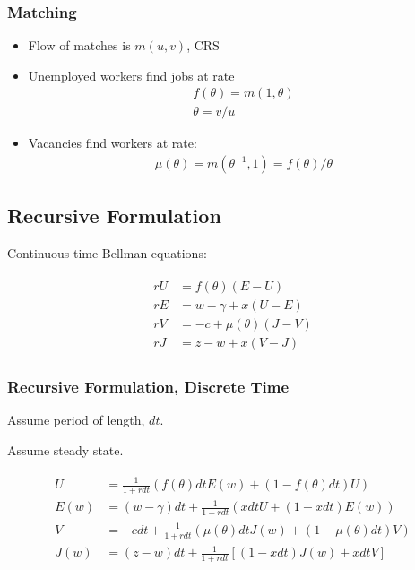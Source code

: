 \documentclass[10pt]{article}
\begin{document}
\subsubsection{Matching}

\begin{itemize}
    \item Flow of matches is $m(u,v)$, CRS
    \item Unemployed workers find jobs at rate
        \begin{align}
            f(\theta) = m(1, \theta) \\
            \theta = v/u
        \end{align}
    \item Vacancies find workers at rate:
        \begin{align}
            \mu(\theta) = m(\theta^{-1}, 1) = f(\theta)/ \theta
        \end{align}
\end{itemize}

\subsection{Recursive Formulation}

Continuous time Bellman equations:

\begin{align}
    \begin{aligned}
        r U & =f(\theta)(E-U) \\
        r E & =w-\gamma+x(U-E) \\
        r V & =-c+\mu(\theta)(J-V) \\
        r J & =z-w+x(V-J)
        \end{aligned}
\end{align}

\subsubsection{Recursive Formulation, Discrete Time}

Assume period of length, $dt$. 

Assume steady state.

\begin{align}
    \begin{aligned}
        U & =\frac{1}{1+r d t}(f(\theta) d t E(w)+(1-f(\theta) d t) U) \\
        E(w) & =(w-\gamma) d t+\frac{1}{1+r d t}(x d t U+(1-x d t) E(w)) \\
        V & =-c d t+\frac{1}{1+r d t}(\mu(\theta) d t J(w)+(1-\mu(\theta) d t) V) \\
        J(w) & =(z-w) d t+\frac{1}{1+r d t}[(1-x d t) J(w)+x d t V]
        \end{aligned}
\end{align}
\end{document}
